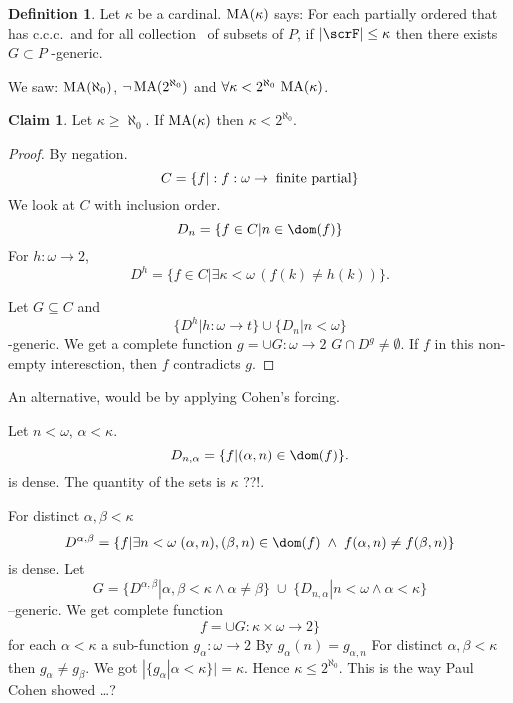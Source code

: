 \documentclass[11pt,pdftex,twoside,a4paper]{article}
\newcommand{\MA}{\ensuremath{\mathop{\rm MA}\nolimits}}
\newcommand{\ccc}{c.c.c.}
\theoremstyle{definition}
\newtheorem{ldef}[thm]{Definition}
\newtheorem{claim}[thm]{Claim}
\begin{document}
\begin{ldef}
Let \(\kappa\) be a cardinal.
\(\MA(\kappa)\) says: For each partially ordered  that 
has \ccc\ and for all collection \scrF\ of subsets of $P$,
if \(|\scrF| \leq \kappa\) then there exists \(G\subset P\) \scrF-generic.
\end{ldef}
We saw: \(\MA(\aleph_0)\), \(\lnot\MA(2^{\aleph_0})\) and 
\(\forall \kappa < 2^{\aleph_0}\, \MA(\kappa)\).

\begin{claim}
Let \(\kappa \geq \aleph_0\). If \(\MA(\kappa)\) then \(\kappa < 2^{\aleph_0}\).
\end{claim}
\begin{proof}
By negation.
\begin{equation*}
C = \{f|: f: \omega \to \;\textnormal{finite partial}\}
\end{equation*}
We look at $C$ with inclusion order.
\begin{equation*}
D_n = \{f\in C| n \in \dom(f)\}
\end{equation*}
For \(h:\omega\to 2\),
\begin{equation*}
D^h = \{f\in C | \exists \kappa < \omega\, (f(k)\neq h(k))\}.
\end{equation*}

Let \(G\subseteq C\) and 
\begin{equation*}
\{D^h | h:\omega\to t\} \cup \{D_n | n < \omega\}
\end{equation*}
-generic. We get a complete function \(g = \cup G:\omega \to 2\)
\(G \cap D^g\neq \emptyset\). 
If $f$ in this non-empty interesction, then $f$ contradicts $g$.
\end{proof}

An alternative, would be by applying Cohen's forcing.

Let \(n<\omega\), \(\alpha < \kappa\).
\begin{equation*}
D_{n,\alpha} = \{f | (\alpha,n)\in \dom(f)\}.
\end{equation*}
is dense. The quantity of the sets is \(\kappa\) ??!.

For distinct \(\alpha,\beta < \kappa\)
\begin{equation*}
D^{\alpha,\beta} = \{f | \exists n < \omega\; (\alpha,n),(\beta,n)\in \dom(f)
\;\land\; f(\alpha,n) \neq f(\beta,n)\}
\end{equation*}
is dense. Let
\begin{equation*}
G = \{D^{\alpha,\beta}| \alpha,\beta<\kappa\land \alpha\neq\beta\}
\;\cup\; \{D_{n,\alpha} | n < \omega \land \alpha < \kappa\}
\end{equation*}
--generic. We get complete function
\begin{equation*}
f = \cup G: \kappa\times\omega \to 2\}
\end{equation*}
for each \(\alpha<\kappa\) a sub-function \(g_\alpha : \omega \to 2\)
By \(g_\alpha(n) = g_{\alpha,n}\)
For distinct \(\alpha,\beta <\kappa\) then \(g_\alpha \neq g_\beta\).
We got \(|\{g_\alpha | \alpha < \kappa\}|= \kappa\).
Hence \(\kappa \leq 2^{\aleph_0}\).
This is the way Paul Cohen showed \ldots ?
\end{document}
